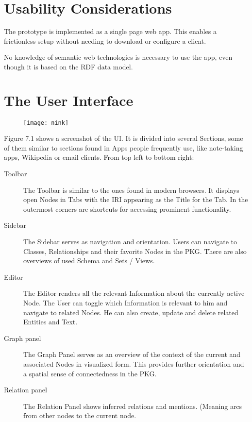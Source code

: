 \section{Usability Considerations}

The prototype is implemented as a single page web app. This enables a frictionless setup without needing to download or configure a client.

No knowledge of semantic web technologies is necessary to use the app, even though it is based on the RDF data model.

\section{The User Interface} 

\begin{figure}[H]
    \texttt{[image: nink]}
\end{figure}

Figure 7.1 shows a screenshot of the UI. It is divided into several Sections, some of them similar to sections found in Apps people frequently use, like note-taking apps, Wikipedia or email clients. From top left to bottom right:
\begin{description}
    \item[Toolbar] The Toolbar is similar to the ones found in modern browsers. It displays open Nodes in Tabs with the IRI appearing as the Title for the Tab. In the outermost corners are shortcuts for accessing prominent functionality.
    \item[Sidebar] The Sidebar serves as navigation and orientation. Users can navigate to Classes, Relationships and their favorite Nodes in the PKG. There are also overviews of used Schema and Sets / Views.
    \item[Editor] The Editor renders all the relevant Information about the currently active Node. The User can toggle which Information is relevant to him and navigate to related Nodes. He can also create, update and delete related Entities and Text.
    \item[Graph panel] The Graph Panel serves as an overview of the context of the current and associated Nodes in visualized form. This provides further orientation and a spatial sense of connectedness in the PKG.
    \item[Relation panel] The Relation Panel shows inferred relations and mentions. (Meaning arcs from other nodes to the current node.
\end{description}


